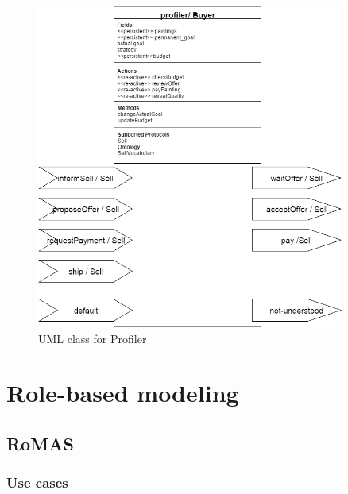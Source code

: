 \documentclass[a4paper,11pt]{report}
\begin{document}
   \begin{figure}[ht!]
    \centering
    \includegraphics[width=0.9\textwidth]{media/profiler_class.png}
    \caption{UML class for Profiler}
    \label{figure:classProfiler}
   \end{figure}
  
  
  \section{Role-based modeling} %
  
  \subsection{RoMAS}
  
  \subsubsection{Use cases}
   
  
\end{document}
